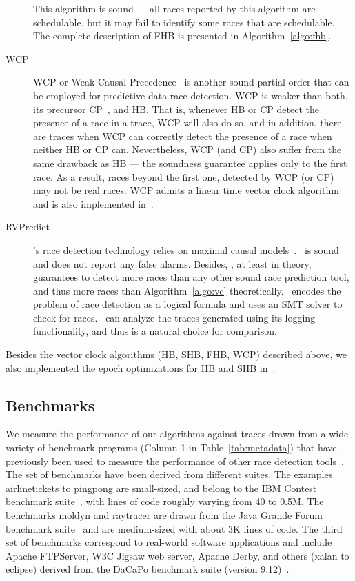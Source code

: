 \begin{description}
  This algorithm is sound --- all races reported by this algorithm are
  schedulable, but it may fail to identify some races that are
  schedulable. The complete description of FHB is presented in Algorithm~\ref{algo:fhb}.
  
\item[WCP] WCP or Weak Causal Precedence~\cite{wcp2017} is another sound
  partial order that can be employed for predictive data race
  detection.  WCP is weaker than both, its precursor CP~\cite{cp2012},
  and HB.  That is, whenever HB or CP detect the presence of a race in
  a trace, WCP will also do so, and in addition, there are traces when
  WCP can correctly detect the presence of a race when neither HB or
  CP can.  Nevertheless, WCP (and CP) also suffer from the same
  drawback as HB --- the soundness guarantee applies only to the first
  race. As a result, races beyond the first one, detected by WCP (or
  CP) may not be real races.  WCP admits a linear time vector clock
  algorithm and is also implemented in~\tool.  
\item[RVPredict] \rvpredict's race detection technology
relies on maximal causal models~\cite{rv2014}. 
\rvpredict~is sound and does not report any false alarms.
Besides, \rvpredict, at least in theory,
guarantees to detect more races than any other sound race prediction tool,
and thus more races than Algorithm~\ref{algo:vc} theoretically.
\rvpredict~encodes the problem of race detection as a logical formula
and uses an SMT solver to check for races.
\rvpredict~can analyze the traces generated using its logging functionality,
and thus is a natural choice for comparison.
\end{description}

Besides the vector clock algorithms (HB, SHB, FHB, WCP) described
above, we also implemented the epoch optimizations for HB and SHB
in~\tool.

\subsection{Benchmarks}

We measure the performance of our algorithms against traces drawn from
a wide variety of benchmark programs (Column 1 in
Table~\ref{tab:metadata}) that have previously been used to measure
the performance of other race detection
tools~\cite{cp2012,rv2014,wcp2017}. 
The set of benchmarks have been derived from different suites.  
The examples \textsf{airlinetickets} to \textsf{pingpong} are
small-sized, and belong to the IBM Contest benchmark
suite~\cite{Farchi2003}, with lines of code roughly varying from 40 to
0.5M.  The benchmarks \textsf{moldyn}
and \textsf{raytracer} are drawn from the Java
Grande Forum benchmark suite~\cite{JGF2001} and are medium-sized with about 3K lines of code.  
The third set of benchmarks correspond to real-world software 
applications and include Apache FTPServer, W3C Jigsaw web server, 
Apache Derby, and others (\textsf{xalan} to \textsf{eclipse}) 
derived from the DaCaPo benchmark suite (version 9.12)~\cite{DaCapo2006}.


